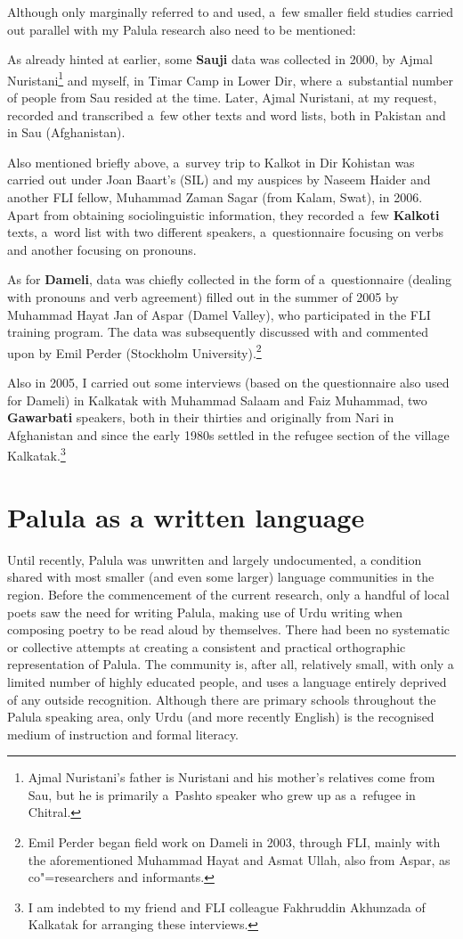 Although only marginally referred to and used, a~few smaller field studies carried out parallel with
my Palula research also need to be mentioned:


As already hinted at earlier, some \textbf{Sauji} data was collected in 2000, by Ajmal
Nuristani\footnote{Ajmal Nuristani's father is Nuristani and his mother's relatives come from Sau,
  but he is primarily a~Pashto speaker who grew up as a~refugee in Chitral.} and myself, in Timar
Camp in Lower Dir, where a~substantial number of people from Sau resided at the time. Later, Ajmal
Nuristani, at my request, recorded and transcribed a~few other texts and word lists, both in
Pakistan and in Sau (Afghanistan).


Also mentioned briefly above, a~survey trip to Kalkot in Dir Kohistan was carried out under Joan
Baart's (SIL) and my auspices by Naseem Haider and another FLI fellow, Muhammad Zaman Sagar (from
Kalam, Swat), in 2006. Apart from obtaining sociolinguistic information, they recorded a~few
\textbf{Kalkoti} texts, a~word list with two different speakers, a~questionnaire focusing on verbs
and another focusing on pronouns.


As for \textbf{Dameli}, data was chiefly collected in the form of a~questionnaire (dealing with
pronouns and verb agreement) filled out in the summer of 2005 by Muhammad Hayat Jan of Aspar (Damel
Valley), who participated in the FLI training program. The data was subsequently discussed with and
commented upon by Emil Perder (Stockholm University).\footnote{Emil Perder began field work on
  Dameli in 2003, through FLI, mainly with the aforementioned Muhammad Hayat and Asmat Ullah, also
  from Aspar, as co"=researchers and informants.}


Also in 2005, I carried out some interviews (based on the questionnaire also used for Dameli) in Kalkatak with Muhammad Salaam and Faiz Muhammad, two \textbf{Gawarbati} speakers, both in their thirties and originally from Nari in Afghanistan and since the early 1980s settled in the refugee section of the village Kalkatak.\footnote{I am indebted to my friend and FLI colleague Fakhruddin Akhunzada of Kalkatak for arranging these interviews.}


\section{Palula as a written language}
\label{sec:1-6b}

Until recently, Palula was unwritten and largely undocumented, a condition shared with most smaller (and even some larger) language communities in the region. Before the commencement of the current research, only a handful of local poets saw the need for writing Palula, making use of Urdu writing when composing poetry to be read aloud by themselves. There had been no systematic or collective attempts at creating a consistent and practical orthographic representation of Palula. The community is, after all, relatively small, with only a limited number of highly educated people, and uses a language entirely deprived of any outside recognition. Although there are primary schools throughout the Palula speaking area, only Urdu (and more recently English) is the recognised medium of instruction and formal literacy.


